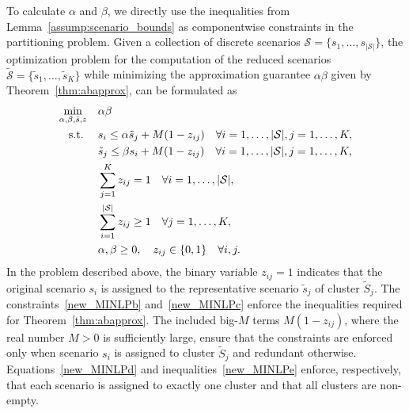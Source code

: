 \documentclass{article}
\newcommand{\mS}{\mathcal{S}}
\newcommand{\tS}{\tilde{\mS}}
\begin{document}
To calculate \(\alpha\) and \(\beta\), we directly use the inequalities from Lemma~\ref{assump:scenario_bounds} as componentwise constraints in the partitioning problem. 
Given a collection of discrete scenarios $\mS=\{s_1,\ldots,s_{|\mS|}\}$, the optimization problem for the computation of the reduced scenarios $\tS=\{\tilde{s}_1,\ldots,\tilde{s}_K\}$ while minimizing the approximation guarantee \(\alpha\beta\) given by Theorem~\ref{thm:abapprox}, can be formulated as
\begin{subequations} \label{Eq:Clustering_MINLP}
	\begin{align}
		\min_{\alpha, \beta,\tilde{s},z} \quad & \alpha\beta \label{new_MINLPa}\\
		\text{ s.t. } \hspace{0.3cm} &  s_i \leq  \alpha \tilde{s}_j + M(1-z_{ij})\quad \forall i=1,\ldots,|\mS|, j=1,\ldots,K, \label{new_MINLPb}
		\\
		& \tilde{s}_j \leq \beta s_i + M(1-z_{ij}) \quad \forall i=1,\ldots,|\mS|, j=1,\ldots,K, \label{new_MINLPc}	
		\\
		&\sum_{j=1}^{K} z_{ij} = 1 \quad \forall i=1,\ldots,|\mS|, \label{new_MINLPd}
		\\
		& \sum_{i=1}^{|\mS|}z_{ij} \geq 1 \quad \forall j=1,\ldots,K, \label{new_MINLPe}
		\\
		& \alpha,\beta\geq 0, \quad  z_{ij} \in \{0,1\} \quad \forall i,j.\label{new_MINLPf}
	\end{align}
\end{subequations}
In the problem described above, the binary variable \(z_{ij} = 1\) indicates that the original scenario \(s_i\) is assigned to the representative scenario \(\tilde{s}_j\) of cluster \(\tilde{S}_j\).  
The constraints~\eqref{new_MINLPb} and~\eqref{new_MINLPc} enforce the inequalities required for Theorem~\ref{thm:abapprox}.  
The included big-\(M\) terms \(M(1-z_{ij})\), where the real number \(M > 0\) is
sufficiently large, ensure that the constraints are enforced only when
scenario \(s_i\) is assigned to cluster \(\tilde{S}_j\) and redundant otherwise.  
Equations~\eqref{new_MINLPd} and inequalities~\eqref{new_MINLPe} enforce, respectively, that each scenario is assigned to exactly one cluster and that all clusters are non-empty.
\end{document}
